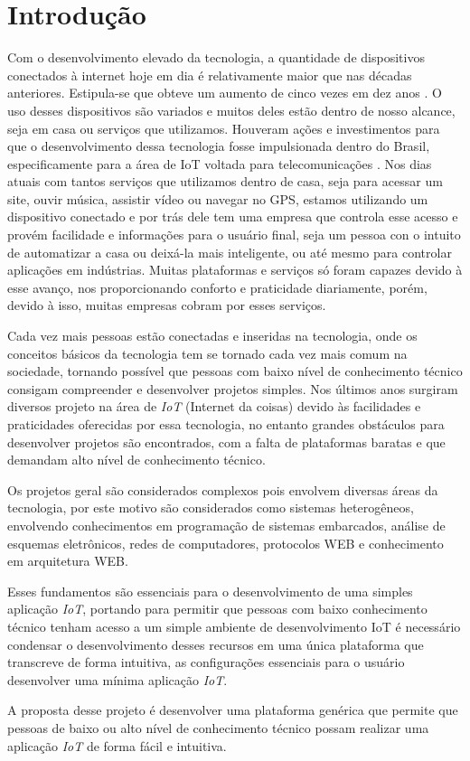 \documentclass[../../layout.tex]{subfiles}
\begin{document}
\chapter{Introdução}
\hspace*{3em}Com o desenvolvimento elevado da tecnologia, a quantidade de dispositivos conectados à internet hoje em dia é relativamente maior que nas décadas anteriores. Estipula-se que obteve um aumento de cinco vezes em dez anos . O uso desses dispositivos são variados e muitos deles estão dentro de nosso alcance, seja em casa ou serviços que utilizamos. Houveram ações e investimentos para que o desenvolvimento dessa tecnologia fosse impulsionada dentro do Brasil, especificamente para a área de IoT voltada para telecomunicações . Nos dias atuais com tantos serviços que utilizamos dentro de casa, seja para acessar um site, ouvir música, assistir vídeo ou navegar no GPS, estamos utilizando um dispositivo conectado e por trás dele tem uma empresa que controla esse acesso e provém facilidade e informações para o usuário final, seja um pessoa con o intuito de automatizar a casa ou deixá-la mais inteligente, ou até mesmo para controlar aplicações em indústrias. Muitas plataformas e serviços só foram capazes devido à esse avanço, nos proporcionando conforto e praticidade diariamente, porém, devido à isso, muitas empresas cobram por esses serviços.\par
Cada vez mais pessoas estão conectadas e inseridas na tecnologia, onde os conceitos básicos da tecnologia tem se tornado cada vez mais comum na sociedade, tornando possível  que pessoas com baixo nível de conhecimento técnico consigam compreender e desenvolver projetos simples. Nos últimos anos surgiram diversos projeto na área de \emph{IoT} (Internet da coisas) devido às facilidades e praticidades oferecidas por essa tecnologia, no entanto grandes obstáculos para desenvolver projetos são encontrados, com a falta de plataformas baratas e que demandam alto nível de conhecimento técnico.\par
Os projetos geral são considerados complexos pois envolvem diversas áreas da tecnologia, por este motivo são considerados como sistemas heterogêneos, envolvendo conhecimentos em programação de sistemas embarcados, análise de esquemas eletrônicos, redes de computadores, protocolos WEB e conhecimento em arquitetura WEB. \par
Esses fundamentos são essenciais para o desenvolvimento de uma simples aplicação \emph{IoT}, portando para permitir que pessoas com baixo conhecimento técnico tenham acesso a um simple ambiente de desenvolvimento IoT é necessário condensar o desenvolvimento desses recursos em uma única plataforma que transcreve de forma intuitiva, as configurações essenciais para o usuário desenvolver uma mínima aplicação \emph{IoT}.\cite{IoTeveryone} \par
A proposta desse projeto é desenvolver uma plataforma genérica que permite que pessoas de baixo ou alto nível de conhecimento técnico possam realizar uma aplicação \emph{IoT} de forma fácil e intuitiva.
\end{document}
